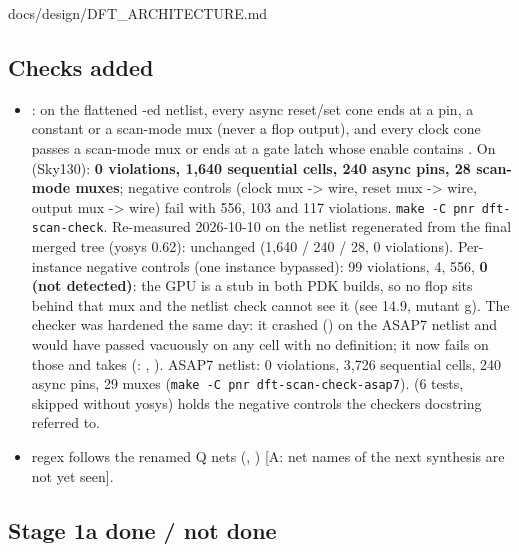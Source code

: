 \begin{relocated}{docs/design/DFT_ARCHITECTURE.md}
\subsection{Checks added}\label{tm:ch:dft-architecture:147-checks-added}

\begin{itemize}
\tightlist
\item
  : on the flattened -ed
  netlist, every async reset/set cone ends at a pin, a constant or a
  scan-mode mux (never a flop output), and every clock cone passes a
  scan-mode mux or ends at a gate latch whose enable contains
  . On  (Sky130): \textbf{0
  violations, 1,640 sequential cells, 240 async pins, 28 scan-mode
  muxes}; negative controls (clock mux -\textgreater{} wire, reset mux
  -\textgreater{} wire,  output mux -\textgreater{}
  wire) fail with 556, 103 and 117 violations.
  \texttt{make\ -\allowbreak{}C\ pnr\ dft-\allowbreak{}scan-\allowbreak{}check}.
  Re-measured 2026-10-10 on the netlist regenerated from the final
  merged tree (yosys 0.62): unchanged (1,640 / 240 / 28, 0 violations).
  Per-instance negative controls (one instance bypassed):
   99 violations,  4, 
  556, \textbf{ 0 (not detected)}: the GPU is a
  stub in both PDK builds, so no flop sits behind that mux and the
  netlist check cannot see it (see 14.9, mutant g). The checker was
  hardened the same day: it crashed () on the ASAP7
  netlist and would have passed vacuously on any cell with no
  definition; it now fails on those and takes 
  (: ,
  ). ASAP7 netlist: 0 violations, 3,726
  sequential cells, 240 async pins, 29 muxes
  (\texttt{make\ -\allowbreak{}C\ pnr\ dft-\allowbreak{}scan-\allowbreak{}check-\allowbreak{}asap7}).
   (6 tests, skipped without yosys)
  holds the negative controls the checker\textquotesingle s docstring
  referred to.
\item
   regex follows the renamed Q
  nets (, ) {[}A:
  net names of the next synthesis are not yet seen{]}.
\end{itemize}

\subsection{Stage 1a done / not done}\label{tm:ch:dft-architecture:148-stage-1a-done-not-done}


\end{relocated}
